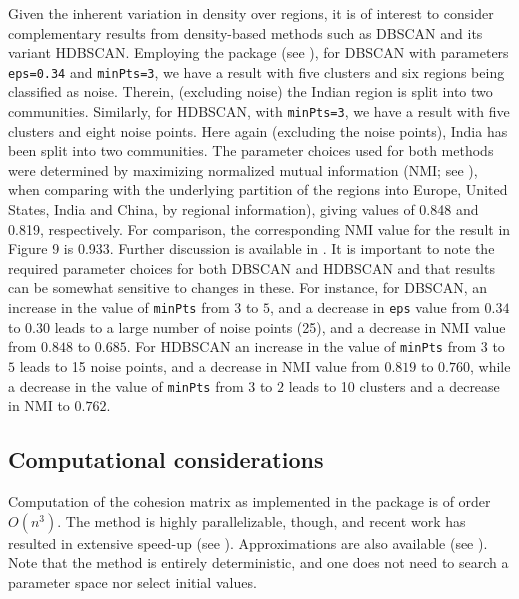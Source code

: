Given the inherent variation in density over regions, it is of interest to consider complementary results from density-based methods such as DBSCAN and its variant HDBSCAN. Employing the  package (see \citet{hahsler2019dbscan}), for DBSCAN with parameters \texttt{eps=0.34} and \texttt{minPts=3}, we have a result with five clusters and six regions being classified as noise. Therein, (excluding noise) the Indian region is split into two communities. Similarly, for HDBSCAN, with \texttt{minPts=3}, we have a result with five clusters and eight noise points. Here again (excluding the noise points), India has been split into two communities. The parameter choices used for both methods were determined by maximizing normalized mutual information (NMI; see \citet{ana2003robust}), when comparing with the underlying partition of the regions into Europe, United States, India and China, by regional information), giving values of 0.848 and 0.819, respectively. For comparison, the corresponding NMI value for the result in Figure 9 is 0.933. Further discussion is available in \citet{berenhaut2022social}. It is important to note the required parameter choices for both DBSCAN and HDBSCAN and that results can be somewhat sensitive to changes in these. For instance, for DBSCAN, an increase in the value of \texttt{minPts} from \(3\) to \(5\), and a decrease in \texttt{eps} value from \(0.34\) to \(0.30\) leads to a large number of noise points (25), and a decrease in NMI value from \(0.848\) to \(0.685\). For HDBSCAN an increase in the value of \texttt{minPts} from \(3\) to \(5\) leads to 15 noise points, and a decrease in NMI value from \(0.819\) to \(0.760\), while a decrease in the value of \texttt{minPts} from \(3\) to \(2\) leads to 10 clusters and a decrease in NMI to \(0.762\).

\hypertarget{computational-considerations}{%
\subsection{Computational considerations}\label{computational-considerations}}

Computation of the cohesion matrix as implemented in the package is of order \(O(n^3)\). The method is highly parallelizable, though, and recent work has resulted in extensive speed-up (see \citet{DB24}). Approximations are also available (see \citet{baron2021partitioned}). Note that the method is entirely deterministic, and one does not need to search a parameter space nor select initial values.


